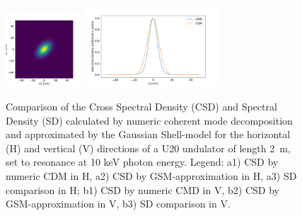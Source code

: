 \documentclass{iopconfser}
\begin{document}
\begin{figure}[H]
    \includegraphics[width=0.25\textwidth]{figures/GSM_V.png}
    \includegraphics[width=0.45\textwidth]{figures/SD_V.png}

        
    \caption{Comparison of the Cross Spectral Density (CSD) and Spectral Density (SD) calculated by numeric coherent mode decomposition and approximated by the Gaussian Shell-model for the horizontal (H) and vertical (V) directions of a U20 undulator of length \SI{2}{\meter},  set to resonance at 10 keV photon energy.
    Legend:
    a1) CSD by numeric CDM in H,
    a2) CSD by GSM-approximation in H,
    a3) SD comparison in H;
    b1) CSD by numeric CMD in V,
    b2) CSD by GSM-approximation in V,
    b3) SD comparison in V.
    }
    \label{fig:GSMvsUND}
\end{figure}
\end{document}
